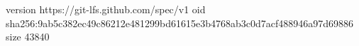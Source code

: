 version https://git-lfs.github.com/spec/v1
oid sha256:9ab5c382ec49c86212e481299bd61615e3b4768ab3c0d7acf488946a97d69886
size 43840

